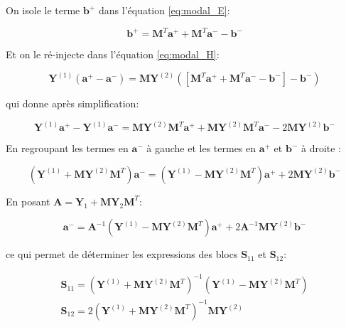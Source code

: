 \documentclass[12pt,a4paper]{report}
\begin{document}
On isole le terme $\mathbf{b^+}$ dans l'équation \eqref{eq:modal_E}:

\begin{equation}
\label{eq:expr_b+}
\mathbf{b}^+ = \mathbf{M}^T \mathbf{a}^+ + \mathbf{M}^T \mathbf{a}^- - \mathbf{b}^-
\end{equation}

Et on le ré-injecte dans l'équation \eqref{eq:modal_H}:

\begin{equation}
\mathbf{Y}^{(1)} (\mathbf{a}^+ - \mathbf{a}^-) = \mathbf{M} \mathbf{Y}^{(2)} \left( [\mathbf{M}^T \mathbf{a}^+ + \mathbf{M}^T \mathbf{a}^- - \mathbf{b}^-] - \mathbf{b}^- \right)
\end{equation}

qui donne après simplification:

\begin{equation}
\mathbf{Y}^{(1)} \mathbf{a}^+ - \mathbf{Y}^{(1)} \mathbf{a}^- = \mathbf{M} \mathbf{Y}^{(2)} \mathbf{M}^T \mathbf{a}^+ + \mathbf{M} \mathbf{Y}^{(2)} \mathbf{M}^T \mathbf{a}^- - 2 \mathbf{M} \mathbf{Y}^{(2)} \mathbf{b}^-
\end{equation}

En regroupant les termes en $\mathbf{a}^-$ à gauche et les termes en $\mathbf{a}^+$ et $\mathbf{b}^-$ à droite :

\begin{equation}
(\mathbf{Y}^{(1)} + \mathbf{M} \mathbf{Y}^{(2)} \mathbf{M}^T) \mathbf{a}^- = (\mathbf{Y}^{(1)} - \mathbf{M} \mathbf{Y}^{(2)} \mathbf{M}^T) \mathbf{a}^+ + 2 \mathbf{M} \mathbf{Y}^{(2)} \mathbf{b}^-
\end{equation}

En posant $\mathbf{A} = \mathbf{Y}_1 + \mathbf{M} \mathbf{Y}_2 \mathbf{M}^T$:

\begin{equation}
\mathbf{a}^- = \mathbf{A}^{-1} (\mathbf{Y}^{(1)} - \mathbf{M} \mathbf{Y}^{(2)} \mathbf{M}^T) \mathbf{a}^+ + 2 \mathbf{A}^{-1} \mathbf{M} \mathbf{Y}^{(2)} \mathbf{b}^-
\end{equation}

ce qui permet de déterminer les expressions des blocs $\mathbf{S}_{11}$ et $\mathbf{S}_{12}$:

\begin{align}
\mathbf{S}_{11} = (\mathbf{Y}^{(1)} + \mathbf{M} \mathbf{Y}^{(2)} \mathbf{M}^T)^{-1} (\mathbf{Y}^{(1)} - \mathbf{M} \mathbf{Y}^{(2)} \mathbf{M}^T) \\
\mathbf{S}_{12} = 2 (\mathbf{Y}^{(1)} + \mathbf{M} \mathbf{Y}^{(2)} \mathbf{M}^T)^{-1} \mathbf{M} \mathbf{Y}^{(2)}
\end{align}
\end{document}
